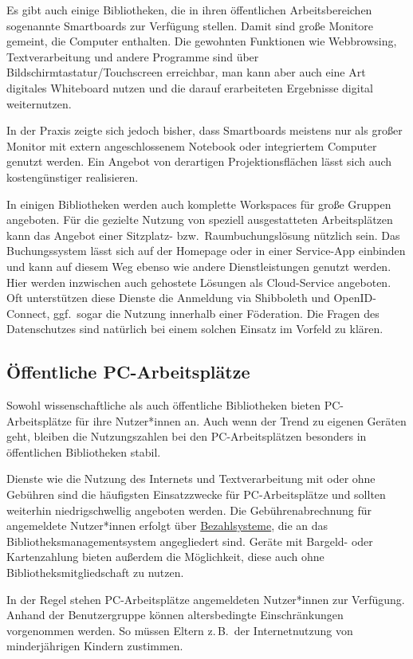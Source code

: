 \documentclass[
  11pt,
  letterpaper,
  DIV=11,
  twoside]{scrreprt}
\begin{document}
Es gibt auch einige Bibliotheken, die in ihren öffentlichen
Arbeitsbereichen sogenannte Smartboards zur Verfügung stellen. Damit
sind große Monitore gemeint, die Computer enthalten. Die gewohnten
Funktionen wie Webbrowsing, Textverarbeitung und andere Programme sind
über Bildschirmtastatur/Touchscreen erreichbar, man kann aber auch eine
Art digitales Whiteboard nutzen und die darauf erarbeiteten Ergebnisse
digital weiternutzen.

In der Praxis zeigte sich jedoch bisher, dass Smartboards meistens nur
als großer Monitor mit extern angeschlossenem Notebook oder integriertem
Computer genutzt werden. Ein Angebot von derartigen Projektionsflächen
lässt sich auch kostengünstiger realisieren.

In einigen Bibliotheken werden auch komplette Workspaces für große
Gruppen angeboten. Für die gezielte Nutzung von speziell ausgestatteten
Arbeitsplätzen kann das Angebot einer Sitzplatz- bzw.~Raumbuchungslösung
nützlich sein. Das Buchungssystem lässt sich auf der Homepage oder in
einer Service-App einbinden und kann auf diesem Weg ebenso wie andere
Dienstleistungen genutzt werden. Hier werden inzwischen auch gehostete
Lösungen als Cloud-Service angeboten. Oft unterstützen diese Dienste die
Anmeldung via Shibboleth und OpenID-Connect, ggf.~sogar die Nutzung
innerhalb einer Föderation. Die Fragen des Datenschutzes sind natürlich
bei einem solchen Einsatz im Vorfeld zu klären.

\subsection{Öffentliche
PC-Arbeitsplätze}\label{uxf6ffentliche-pc-arbeitspluxe4tze}

Sowohl wissenschaftliche als auch öffentliche Bibliotheken bieten
PC-Arbeitsplätze für ihre Nutzer*innen an. Auch wenn der Trend zu
eigenen Geräten geht, bleiben die Nutzungszahlen bei den
PC-Arbeitsplätzen besonders in öffentlichen Bibliotheken stabil.

Dienste wie die Nutzung des Internets und Textverarbeitung mit oder ohne
Gebühren sind die häufigsten Einsatzzwecke für PC-Arbeitsplätze und
sollten weiterhin niedrigschwellig angeboten werden. Die
Gebührenabrechnung für angemeldete Nutzer*innen erfolgt über
\hyperref[]{Bezahlsysteme}, die an das Bibliotheksmanagementsystem
angegliedert sind. Geräte mit Bargeld- oder Kartenzahlung bieten
außerdem die Möglichkeit, diese auch ohne Bibliotheksmitgliedschaft zu
nutzen.

In der Regel stehen PC-Arbeitsplätze angemeldeten Nutzer*innen zur
Verfügung. Anhand der Benutzergruppe können altersbedingte
Einschränkungen vorgenommen werden. So müssen Eltern z.\,B.~der
Internetnutzung von minderjährigen Kindern zustimmen.
\end{document}
